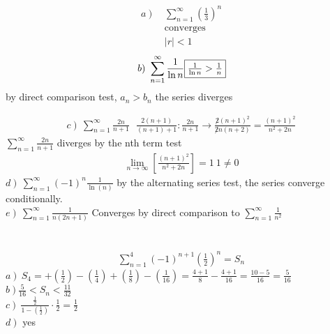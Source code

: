 \documentclass{article}
\begin{document}
\section{}
	\begin{multicols}{2}
		\begin{align*}
			\left.a\right)\ &\sum\limits_{n=1}^{\infty}{\left(\frac{1}{3}\right)^n}\\
			&\text{converges}\\
			&\left|r\right|<1
		\end{align*}
		\vfill\columnbreak
		\begin{align*}
			\left.b\right)\ 
			\sum\limits_{n=1}^{\infty}{\frac{1}{\ln{n}}}
			\fbox{$\frac{1}{\ln{n}}>\frac{1}{n}$}
		\end{align*}
		by direct comparison test, $a_n>b_n$ the series diverges
	\end{multicols}
	\begin{align*}
		\left.c\right)\ \sum\limits_{n=1}^{\infty}{\frac{2n}{n+1}}\ \ \ \frac{2(n+1)}{(n+1)+1}: \frac{2n}{n+1}\rightarrow \frac{\not 2 (n+1)^2}{\not 2 n(n+2)}=\frac{(n+1)^2}{n^2+2n}
	\end{align*}
	$\sum\limits_{n=1}^{\infty}{\frac{2n}{n+1}}$ diverges by the nth term test
	\begin{align*}
		\lim\limits_{n\rightarrow \infty}\left[\frac{(n+1)^2}{n^2+2n}\right]=1\ 1\not=0
	\end{align*}
	$\left.d\right)\ \sum\limits_{n=1}^{\infty}{\left(-1\right)}^n\frac{1}{\ln(n)}$ by the alternating series test, the series converge conditionally.\\
	$\left.e\right)\ \sum\limits_{n=1}^{\infty}\frac{1}{n(2n+1)}$ Converges by direct comparison to $\sum\limits_{n=1}^{\infty}{\frac{1}{n^2}}$
	
\section{}	
	\begin{align*}
		\sum\limits_{n=1}^{4}{\left(-1\right)^{n+1}\left(\frac{1}{2}\right)^n}=S_n
	\end{align*}
	$\left.a\right)\ S_4 = +\left(\frac{1}{2}\right)-\left(\frac{1}{4}\right)+\left(\frac{1}{8}\right)-\left(\frac{1}{16}\right) = \frac{4+1}{8}-\frac{4+1}{16} = \frac{10-5}{16} = \frac{5}{16}$\\
	$\left.b\right) \frac{5}{16}<S_n<\frac{11}{32}$\\
	$\left.c\right)\ \frac{\frac{1}{2}}{1-\left(\frac{1}{2}\right)}\cdot \frac{1}{2}=\frac{1}{2}$\\
	$\left.d\right)$ yes
	
\end{document}
